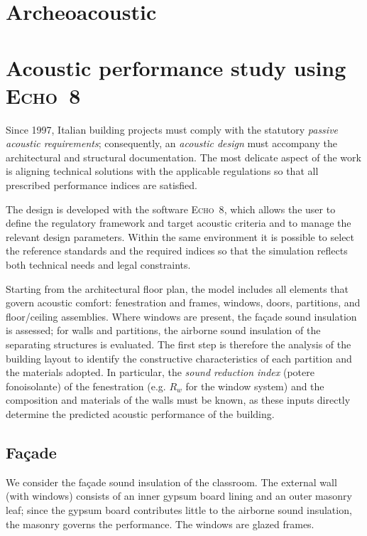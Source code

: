 \section{Archeoacoustic}

\section{Acoustic performance study using \textsc{Echo~8}}

Since 1997, Italian building projects must comply with the statutory \emph{passive acoustic requirements}; consequently, an \emph{acoustic design} must accompany the architectural and structural documentation. The most delicate aspect of the work is aligning technical solutions with the applicable regulations so that all prescribed performance indices are satisfied.

The design is developed with the software \textsc{Echo~8}, which allows the user to define the regulatory framework and target acoustic criteria and to manage the relevant design parameters. Within the same environment it is possible to select the reference standards and the required indices so that the simulation reflects both technical needs and legal constraints.

Starting from the architectural floor plan, the model includes all elements that govern acoustic comfort: fenestration and frames, windows, doors, partitions, and floor/ceiling assemblies. Where windows are present, the façade sound insulation is assessed; for walls and partitions, the airborne sound insulation of the separating structures is evaluated. The first step is therefore the analysis of the building layout to identify the constructive characteristics of each partition and the materials adopted. In particular, the \emph{sound reduction index} (potere fonoisolante) of the fenestration (e.g. \(R_w\) for the window system) and the composition and materials of the walls must be known, as these inputs directly determine the predicted acoustic performance of the building.

\subsection{Façade}

We consider the façade sound insulation of the classroom. The external wall
(with windows) consists of an inner gypsum board lining and an outer masonry
leaf; since the gypsum board contributes little to the airborne sound
insulation, the masonry governs the performance. The windows are glazed
frames.


